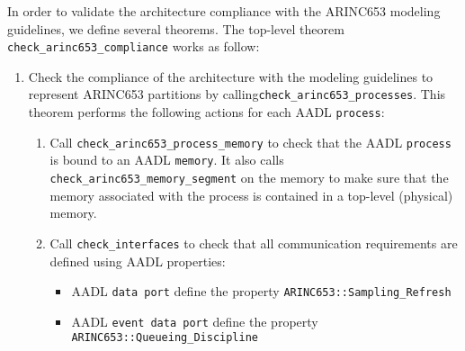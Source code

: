 \documentclass[times, 10pt]{article}
\begin{document}
In order to validate the architecture compliance with the ARINC653 modeling
guidelines, we define several theorems. The top-level theorem
\texttt{check\_arinc653\_compliance} works as follow:
\begin{enumerate}
    \item
        Check the compliance of the architecture with
        the modeling guidelines to represent ARINC653 partitions
        by calling\texttt{check\_arinc653\_processes}. This theorem
        performs the following actions for each AADL \texttt{process}:
        \begin{enumerate}
            \item
                Call \texttt{check\_arinc653\_process\_memory} to check
                that the AADL \texttt{process} is bound to an AADL
                \texttt{memory}. It also calls
                \texttt{check\_arinc653\_memory\_segment} on the memory to make
                sure that the memory associated with the process is contained
                in a top-level (physical) memory.

            \item
                Call \texttt{check\_interfaces} to check that all communication
                requirements are defined using AADL properties:
                \begin{itemize}
                    \item
                        AADL \texttt{data port} define the property
                        \texttt{ARINC653::Sampling\_Refresh}
                    \item
                        AADL \texttt{event data port} define the property
                        \texttt{ARINC653::Queueing\_Discipline}
                \end{itemize}


\end{enumerate}
\end{enumerate}
\end{document}
